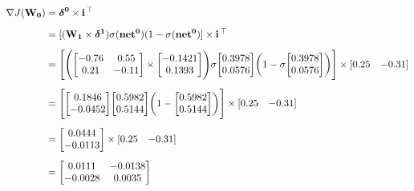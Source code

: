 \documentclass{article}
\begin{document}
\begin{align*}
    \nabla J(\mathbf{W_0}) &= \mathbf{\boldsymbol{\delta}^0} \times \mathbf{i} \thinspace ^\top \\[0.5em]
    &= [(\mathbf{W_1} \times \mathbf{\boldsymbol{\delta}^1}) \sigma(\mathbf{net^0})(1-\sigma(\mathbf{net^0})] \times \mathbf{i} \thinspace ^\top \\[0.5em]
    &= \Bigg[ \Bigg(\bigg[\begin{matrix} -0.76 & 0.55 \\ 0.21 & -0.11 \end{matrix}\bigg] \times \bigg[\begin{matrix} -0.1421 \\ 0.1393 \end{matrix} \bigg]\Bigg)
    \sigma\bigg[\begin{matrix} 0.3978\\ 0.0576 \end{matrix} \bigg]
    \bigg(1- \sigma\bigg[ \begin{matrix} 0.3978\\ 0.0576 \end{matrix} \bigg] \bigg) \Bigg] \times 
    [ \begin{matrix} 0.25 & -0.31 \end{matrix} ] \\[0.5em]
    &= \Bigg[ \bigg[\begin{matrix} 0.1846 \\ -0.0452  \end{matrix}\bigg]
              \bigg[\begin{matrix} 0.5982 \\ 0.5144  \end{matrix}\bigg]
              \bigg(1- \bigg[\begin{matrix} 0.5982 \\ 0.5144  \end{matrix}\bigg] \bigg) \Bigg] \times 
    [ \begin{matrix} 0.25 & -0.31 \end{matrix} ] \\[0.5em]
    &= \bigg[\begin{matrix} 0.0444 \\ -0.0113 \end{matrix}\bigg] \times 
    [ \begin{matrix} 0.25 & -0.31 \end{matrix} ] \\[0.5em]
    &= \bigg[\begin{matrix} 0.0111 & -0.0138 \\ -0.0028 & 0.0035 \end{matrix}\bigg]
\end{align*}
\end{document}
